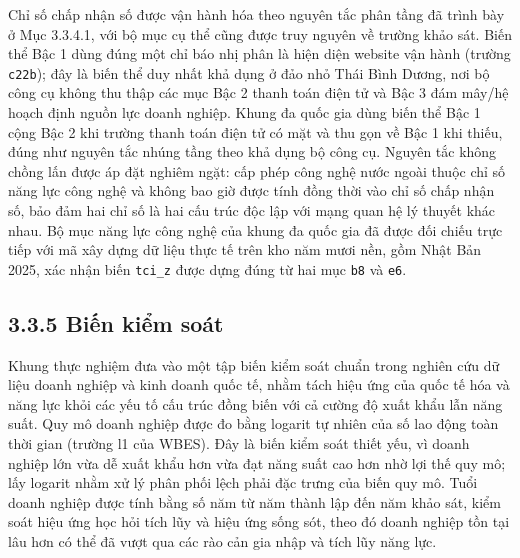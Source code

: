 \documentclass[
  a4paper,
  13pt]{extreport}
\begin{document}
Chỉ số chấp nhận số được vận hành hóa theo nguyên tắc phân tầng đã trình
bày ở Mục 3.3.4.1, với bộ mục cụ thể cũng được truy nguyên về trường
khảo sát. Biến thể Bậc 1 dùng đúng một chỉ báo nhị phân là hiện diện
website vận hành (trường \texttt{c22b}); đây là biến thể duy nhất khả
dụng ở đảo nhỏ Thái Bình Dương, nơi bộ công cụ không thu thập các mục
Bậc 2 thanh toán điện tử và Bậc 3 đám mây/hệ hoạch định nguồn lực doanh
nghiệp. Khung đa quốc gia dùng biến thể Bậc 1 cộng Bậc 2 khi trường
thanh toán điện tử có mặt và thu gọn về Bậc 1 khi thiếu, đúng như nguyên
tắc nhúng tầng theo khả dụng bộ công cụ. Nguyên tắc không chồng lấn được
áp đặt nghiêm ngặt: cấp phép công nghệ nước ngoài thuộc chỉ số năng lực
công nghệ và không bao giờ được tính đồng thời vào chỉ số chấp nhận số,
bảo đảm hai chỉ số là hai cấu trúc độc lập với mạng quan hệ lý thuyết
khác nhau. Bộ mục năng lực công nghệ của khung đa quốc gia đã được đối
chiếu trực tiếp với mã xây dựng dữ liệu thực tế trên kho năm mươi nền,
gồm Nhật Bản 2025, xác nhận biến \texttt{tci\_z} được dựng đúng từ hai
mục \texttt{b8} và \texttt{e6}.

\hypertarget{biux1ebfn-kiux1ec3m-souxe1t}{%
\subsection{3.3.5 Biến kiểm soát}\label{biux1ebfn-kiux1ec3m-souxe1t}}

Khung thực nghiệm đưa vào một tập biến kiểm soát chuẩn trong nghiên cứu
dữ liệu doanh nghiệp và kinh doanh quốc tế, nhằm tách hiệu ứng của quốc
tế hóa và năng lực khỏi các yếu tố cấu trúc đồng biến với cả cường độ
xuất khẩu lẫn năng suất. Quy mô doanh nghiệp được đo bằng logarit tự
nhiên của số lao động toàn thời gian (trường l1 của WBES). Đây là biến
kiểm soát thiết yếu, vì doanh nghiệp lớn vừa dễ xuất khẩu hơn vừa đạt
năng suất cao hơn nhờ lợi thế quy mô; lấy logarit nhằm xử lý phân phối
lệch phải đặc trưng của biến quy mô. Tuổi doanh nghiệp được tính bằng số
năm từ năm thành lập đến năm khảo sát, kiểm soát hiệu ứng học hỏi tích
lũy và hiệu ứng sống sót, theo đó doanh nghiệp tồn tại lâu hơn có thể đã
vượt qua các rào cản gia nhập và tích lũy năng lực.
\end{document}
